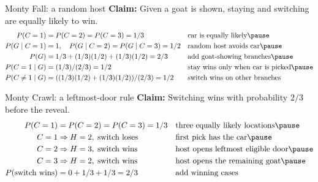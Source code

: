 \documentclass[aspectratio=169,10pt]{beamer}
\begin{document}
\begin{frame}{Monty Fall: a random host}
\textbf{Claim:} Given a goat is shown, staying and switching are equally likely to win.
\begin{align*}
P(C=1)&=P(C=2)=P(C=3)=1/3 &&\text{car is equally likely}\pause\\
P(G\mid C=1)&=1,\quad P(G\mid C=2)=P(G\mid C=3)=1/2 &&\text{random host avoids car}\pause\\
P(G)&=1/3+(1/3)(1/2)+(1/3)(1/2)=2/3 &&\text{add goat-showing branches}\pause\\
P(C=1\mid G)&=(1/3)/(2/3)=1/2 &&\text{stay wins only when car is picked}\pause\\
P(C\ne1\mid G)&=((1/3)(1/2)+(1/3)(1/2))/(2/3)=1/2 &&\text{switch wins on other branches}
\end{align*}
\centering{}
\end{frame}
\begin{frame}{Monty Crawl: a leftmost-door rule}
\textbf{Claim:} Switching wins with probability $2/3$ before the reveal.
\begin{align*}
P(C=1)&=P(C=2)=P(C=3)=1/3 &&\text{three equally likely locations}\pause\\
C=1&\Rightarrow H=2,\;\text{switch loses} &&\text{first pick has the car}\pause\\
C=2&\Rightarrow H=3,\;\text{switch wins} &&\text{host opens leftmost eligible door}\pause\\
C=3&\Rightarrow H=2,\;\text{switch wins} &&\text{host opens the remaining goat}\pause\\
P(\text{switch wins})&=0+1/3+1/3=2/3 &&\text{add winning cases}
\end{align*}
\end{frame}
\end{document}
